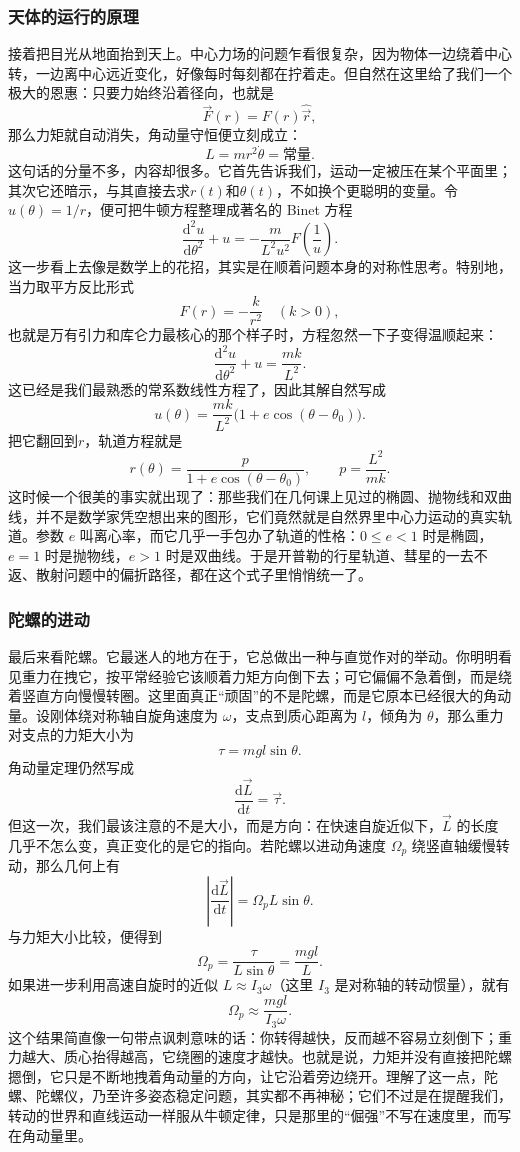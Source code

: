 \documentclass[UTF8]{ctexbook}
\begin{document}
\subsubsection{天体的运行的原理}

接着把目光从地面抬到天上。中心力场的问题乍看很复杂，因为物体一边绕着中心转，一边离中心远近变化，好像每时每刻都在拧着走。但自然在这里给了我们一个极大的恩惠：只要力始终沿着径向，也就是
\[
\vec{F}(r)=F(r)\hat{\vec{r}},
\]
那么力矩就自动消失，角动量守恒便立刻成立：
\[
L=m r^2\dot\theta=\text{常量}.
\]
这句话的分量不多，内容却很多。它首先告诉我们，运动一定被压在某个平面里；其次它还暗示，与其直接去求$r(t)$和$\theta(t)$，不如换个更聪明的变量。令 \(u(\theta)=1/r\)，便可把牛顿方程整理成著名的 Binet 方程
\[
\frac{\mathrm d^2u}{\mathrm d\theta^2}+u=-\frac{m}{L^2u^2}F\!\left(\frac1u\right).
\]
这一步看上去像是数学上的花招，其实是在顺着问题本身的对称性思考。特别地，当力取平方反比形式
\[
F(r)=-\frac{k}{r^2}\quad (k>0),
\]
也就是万有引力和库仑力最核心的那个样子时，方程忽然一下子变得温顺起来：
\[
\frac{\mathrm d^2u}{\mathrm d\theta^2}+u=\frac{mk}{L^2}.
\]
这已经是我们最熟悉的常系数线性方程了，因此其解自然写成
\[
u(\theta)=\frac{mk}{L^2}\bigl(1+e\cos(\theta-\theta_0)\bigr).
\]
把它翻回到$r$，轨道方程就是
\[
r(\theta)=\frac{p}{1+e\cos(\theta-\theta_0)},
\qquad
p=\frac{L^2}{mk}.
\]
这时候一个很美的事实就出现了：那些我们在几何课上见过的椭圆、抛物线和双曲线，并不是数学家凭空想出来的图形，它们竟然就是自然界里中心力运动的真实轨道。参数 \(e\) 叫离心率，而它几乎一手包办了轨道的性格：\(0\le e<1\) 时是椭圆，\(e=1\) 时是抛物线，\(e>1\) 时是双曲线。于是开普勒的行星轨道、彗星的一去不返、散射问题中的偏折路径，都在这个式子里悄悄统一了。

\subsubsection{陀螺的进动}

最后来看陀螺。它最迷人的地方在于，它总做出一种与直觉作对的举动。你明明看见重力在拽它，按平常经验它该顺着力矩方向倒下去；可它偏偏不急着倒，而是绕着竖直方向慢慢转圈。这里面真正“顽固”的不是陀螺，而是它原本已经很大的角动量。设刚体绕对称轴自旋角速度为 \(\omega\)，支点到质心距离为 \(l\)，倾角为 \(\theta\)，那么重力对支点的力矩大小为
\[
\tau = mgl\sin\theta.
\]
角动量定理仍然写成
\[
\frac{\mathrm d\vec{L}}{\mathrm dt}=\vec{\tau}.
\]
但这一次，我们最该注意的不是大小，而是方向：在快速自旋近似下，\(\vec{L}\) 的长度几乎不怎么变，真正变化的是它的指向。若陀螺以进动角速度 \(\Omega_p\) 绕竖直轴缓慢转动，那么几何上有
\[
\left|\frac{\mathrm d\vec{L}}{\mathrm dt}\right|=\Omega_p L\sin\theta.
\]
与力矩大小比较，便得到
\[
\Omega_p=\frac{\tau}{L\sin\theta}=\frac{mgl}{L}.
\]
如果进一步利用高速自旋时的近似 \(L\approx I_3\omega\)（这里 \(I_3\) 是对称轴的转动惯量），就有
\[
\Omega_p\approx\frac{mgl}{I_3\omega}.
\]
这个结果简直像一句带点讽刺意味的话：你转得越快，反而越不容易立刻倒下；重力越大、质心抬得越高，它绕圈的速度才越快。也就是说，力矩并没有直接把陀螺摁倒，它只是不断地拽着角动量的方向，让它沿着旁边绕开。理解了这一点，陀螺、陀螺仪，乃至许多姿态稳定问题，其实都不再神秘；它们不过是在提醒我们，转动的世界和直线运动一样服从牛顿定律，只是那里的“倔强”不写在速度里，而写在角动量里。
\end{document}

